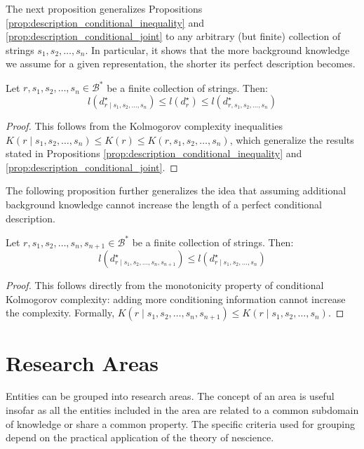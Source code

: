 The next proposition generalizes Propositions \ref{prop:description_conditional_inequality} and \ref{prop:description_conditional_joint} to any arbitrary (but finite) collection of strings $s_1, s_2, \ldots, s_n$. In particular, it shows that the more background knowledge we assume for a given representation, the shorter its perfect description becomes.

\begin{proposition}
Let $r, s_1, s_2, \ldots, s_n \in \mathcal{B}^\ast$ be a finite collection of strings. Then:
\[
l \left( d^\star_{r \mid s_1, s_2, \ldots, s_n} \right) \leq l \left( d^\star_r \right) \leq l \left( d^\star_{r,s_1, s_2, \ldots, s_n} \right)
\]
\end{proposition}
\begin{proof}
This follows from the Kolmogorov complexity inequalities $K(r \mid s_1, s_2, \ldots, s_n) \leq K(r) \leq K(r, s_1, s_2, \ldots, s_n)$, which generalize the results stated in Propositions \ref{prop:description_conditional_inequality} and \ref{prop:description_conditional_joint}.
\end{proof}

The following proposition further generalizes the idea that assuming additional background knowledge cannot increase the length of a perfect conditional description.

\begin{proposition}
Let $r, s_1, s_2, \ldots, s_n, s_{n+1} \in \mathcal{B}^\ast$ be a finite collection of strings. Then:
\[
l \left( d^\star_{r \mid s_1, s_2, \ldots, s_n, s_{n+1}} \right) \leq l \left( d^\star_{r \mid s_1, s_2, \ldots, s_n} \right)
\]
\end{proposition}
\begin{proof}
This follows directly from the monotonicity property of conditional Kolmogorov complexity: adding more conditioning information cannot increase the complexity. Formally, $K(r \mid s_1, s_2, \ldots, s_n, s_{n+1}) \leq K(r \mid s_1, s_2, \ldots, s_n)$.
\end{proof}

%
%

\section{Research Areas}
\label{sec:areas}

Entities can be grouped into research areas. The concept of an area is useful insofar as all the entities included in the area are related to a common subdomain of knowledge or share a common property. The specific criteria used for grouping depend on the practical application of the theory of nescience.

